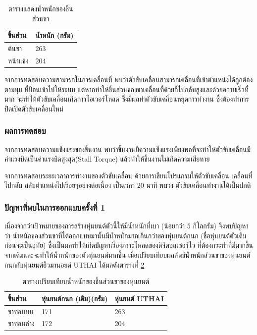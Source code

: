 \begin{table}[ht]
	\centering
	\begin{tabular}{| l | l |}
		\hline
		ชิ้นส่วน & น้ำหนัก (กรัม) \\
        \hline
        ต้นขา & 263 \\
        หน้าแข้ง & 204 \\
	    \hline
	\end{tabular}
	\caption{ตารางแสดงน้ำหนักของชิ้นส่วนขา}
	\label{tab:UTHAI_leg}
\end{table}

จากการทดสอบความสามารถในการเคลื่อนที่ พบว่าตัวขับเคลื่อนสามารถเคลื่อนที่เข้าตำแหน่งได้ถูกต้องตามมุม 
ที่ป้อนเข้าไปให้ระบบ แต่หากทำให้ชิ้นส่วนของขาเคลื่อนที่ด้วยถี่ไปกลับสูงและด้วยความเร็วที่มาก จะทำให้ตัวขับเคลื่อนเกิดการโอเวอร์โหลด 
ซึ่งมีผลทำตัวขับเคลื่อนหยุดการทำงาน ซึ่งต้องทำการปิดเปิดตัวขับเคลื่อนใหม่

\clearpage
\subsubsection*{ผลการทดสอบ}
จากการทดสอบความแข็งแรงของชิ้นงาน พบว่าชิ้นงานมีความแข็งแรงเพียงพอที่จะทำให้ตัวขับเคลื่อนมีค่าแรงบิดเป็นค่าแรงบิดสูงสุด(Stall Torque)
แล้วทำให้ชิ้นงานไม่เกิดความเสียหาย

จากการทดสอบระยะเวลาการทำงานของตัวขับเคลื่อน ด้วยการเขียนโปรแกรมให้ตัวขับเคลื่อน เคลื่อนที่ไปกลับ สลับตำแหน่งไปเรื่อยๆอย่างต่อเนื่อง เป็นเวลา 20 นาที
พบว่า ตัวขับเคลื่อนทำงานได้เป็นปกติ

\subsubsection*{ปัญหาที่พบในการออกแบบครั้งที่ 1}
เนื่องจากว่าเป้าหมายของการสร้างหุ่นยนต์ตัวนี้ให้มีน้ำหนักที่เบา (น้อยกว่า 5 กิโลกรัม) จึงพบปัญหาว่า
น้ำหนักของส่วนขาที่ได้ออกแบบมานั้นมีน้ำหนักมากเกินกว่าของหุ่นยนต์กนก (ชื่อหุ่นยนต์ตัวเดิมก่อนจะเป็นอุทัย)
ซึ่งเป็นผลทำให้เกิดปํญหาเรื่องภาระโหลดของดิจิตอลเซอร์โว ที่ต้องกระทำที่มีมากขึ้นจากเดิมและจะทำให้น้ำหนักของตัวหุ่นยนต์มากขึ้น 
เมื่อเปรียบเทียบผลลัพธ์น้ำหนักส่วนขาของหุ่นยนต์กนกกับหุ่นยนต์ฮิวมานอยด์ UTHAI ได้ผลดังตารางที่ \ref{tab:UTHAI_KANOK_Comp}

\begin{table}[ht]
	\centering
	\begin{tabular}{| l | l | l |}
		\hline
        ชิ้นส่วน & หุ่นยนต์กนก (เดิม)(กรัม) & หุ่นยนต์ UTHAI \\
        \hline
        ขาท่อนบน & 171 & 263 \\
        ขาท่อนล่าง & 172 & 204 \\
	    \hline
	\end{tabular}
	\caption{ตารางเปรียบเทียบน้ำหนักของชิ้นส่วนขาของหุ่นยนต์}
	\label{tab:UTHAI_KANOK_Comp}
\end{table}

